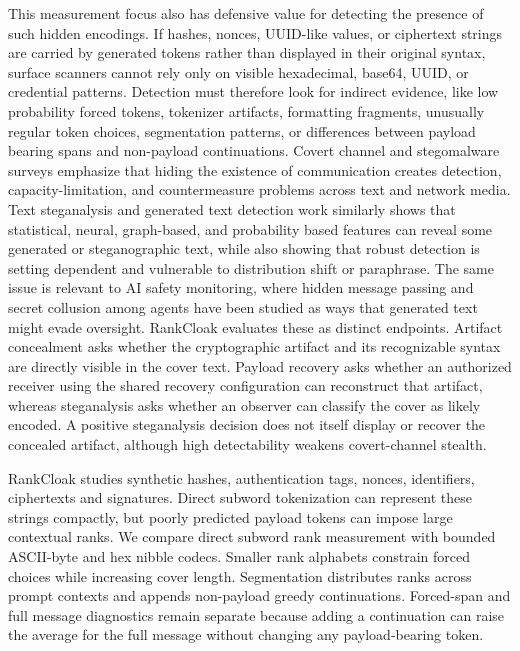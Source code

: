 \documentclass[fleqn,10pt]{wlscirep}
\begin{document}
This measurement focus also has defensive value for detecting the presence of such hidden encodings. If hashes, nonces, UUID-like values, or ciphertext strings are carried by generated tokens rather than displayed in their original syntax, surface scanners cannot rely only on visible hexadecimal, base64, UUID, or credential patterns. Detection must therefore look for indirect evidence, like low probability forced tokens, tokenizer artifacts, formatting fragments, unusually regular token choices, segmentation patterns, or differences between payload bearing spans and non-payload continuations. Covert channel and stegomalware surveys emphasize that hiding the existence of communication creates detection, capacity-limitation, and countermeasure problems across text and network media\cite{Zander2007CovertChannelsCountermeasures,Badar2025StegomalwareSurvey}. Text steganalysis and generated text detection work similarly shows that statistical, neural, graph-based, and probability based features can reveal some generated or steganographic text, while also showing that robust detection is setting dependent and vulnerable to distribution shift or paraphrase\cite{Wen2019CNNTextSteganalysis,Wu2021GNNLinguisticSteganalysis,Wang2023FewShotLinguisticSteganalysis,Gehrmann2019GLTR,Mitchell2023DetectGPT,Sadasivan2025AIDetection}. The same issue is relevant to AI safety monitoring, where hidden message passing and secret collusion among agents have been studied as ways that generated text might evade oversight\cite{Motwani2024SecretCollusion,Zolkowski2026EarlySigns}. RankCloak evaluates these as distinct endpoints. Artifact concealment asks whether the cryptographic artifact and its recognizable syntax are directly visible in the cover text. Payload recovery asks whether an authorized receiver using the shared recovery configuration can reconstruct that artifact, whereas steganalysis asks whether an observer can classify the cover as likely encoded. A positive steganalysis decision does not itself display or recover the concealed artifact, although high detectability weakens covert-channel stealth.

RankCloak studies synthetic hashes, authentication tags, nonces, identifiers, ciphertexts and signatures\cite{NIST2015SecureHashStandard,Josefsson2006RFC4648,DavisPeabodyLeach2024RFC9562}. Direct subword tokenization can represent these strings compactly, but poorly predicted payload tokens can impose large contextual ranks\cite{Sennrich2016SubwordUnits,KudoRichardson2018SentencePiece}. We compare direct subword rank measurement with bounded ASCII-byte and hex nibble codecs. Smaller rank alphabets constrain forced choices while increasing cover length. Segmentation distributes ranks across prompt contexts and appends non-payload greedy continuations. Forced-span and full message diagnostics remain separate because adding a continuation can raise the average for the full message without changing any payload-bearing token.
\end{document}
